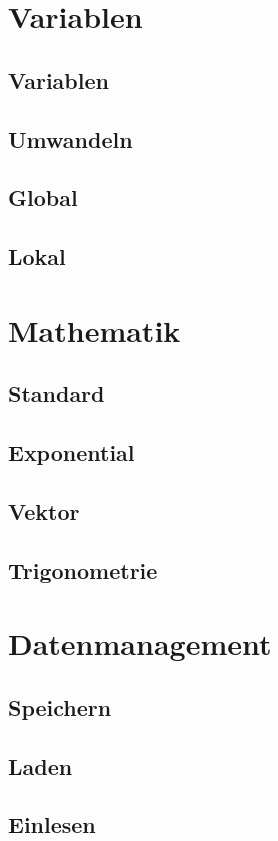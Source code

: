 \documentclass[twoside,a4paper,12pt]{article}
\begin{document}
\section{Variablen}
\subsection{Variablen}
\subsection{Umwandeln}
\subsection{Global}
\subsection{Lokal}

\section{Mathematik}
\subsection{Standard}
\subsection{Exponential}
\subsection{Vektor}
\subsection{Trigonometrie}

\section{Datenmanagement}
\subsection{Speichern}
\subsection{Laden}
\subsection{Einlesen}
\end{document}
